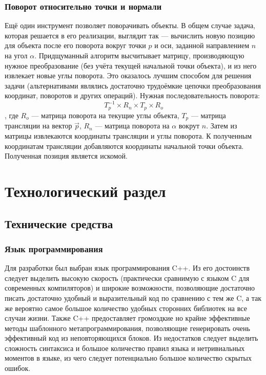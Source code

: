 \documentclass[a4paper,12pt]{report}
\numberwithin{equation}{section}
\begin{document}
\subsubsection{Поворот относительно точки и нормали}
Ещё один инструмент позволяет поворачивать объекты. В общем случае задача, которая решается в его реализации, выглядит так --- вычислить новую позицию для объекта после его поворота вокруг точки $p$ и оси, заданной направлением $n$ на угол $\alpha$. Придщуманный алгоритм высчитывает матрицу, производяющую нужное преобразование (без учёта текущей начальной точки объекта), и из него извлекает новые углы поворота. Это оказалось лучшим способом для решения задачи (альтернативами являлись достаточно трудоёмкие цепочки преобразования координат, поворотов и других операций). Нужная последовательность поворота:
\begin{equation}
T_p^{-1} \times R_n \times T_p \times R_o
\end{equation}
, где $R_o$ --- матрица поворота на текущие углы объекта, $T_p$ --- матрица трансляции на вектор $\vec{p}$, $R_n$ --- матрица поворота на $\alpha$ вокрут $n$. Затем из матрицы извлекаются координаты трансляции и углы поворота. К полученным координатам трансляции добавляются координаты начальной точки объекта. Полученная позиция является искомой.

\section{Технологический раздел}

\subsection{Технические средства}

\subsubsection{Язык программирования}
Для разработки был выбран язык программирования C++. Из его достоинств следует выделить высокую скорость (практически сравнимую с языком C для современных компиляторов) и широкие возможности, позволяющие достаточно писать достаточно удобный и выразительный код по сравнению с тем же C, а так же вероятно самое большое количество удобных сторонних библиотек на все случаи жизни. Также C++ предоставляет громоздкие но крайне эффективные методы шаблонного метапрограммирования, позволяющие генерировать очень эффективный код из неповторяющихся блоков. Из недостатков следует выделить сложность синтаксиса и большое количество правил языка и нетривиальных моментов в языке, из чего следует потенциально большое количество скрытых ошибок.
\end{document}
